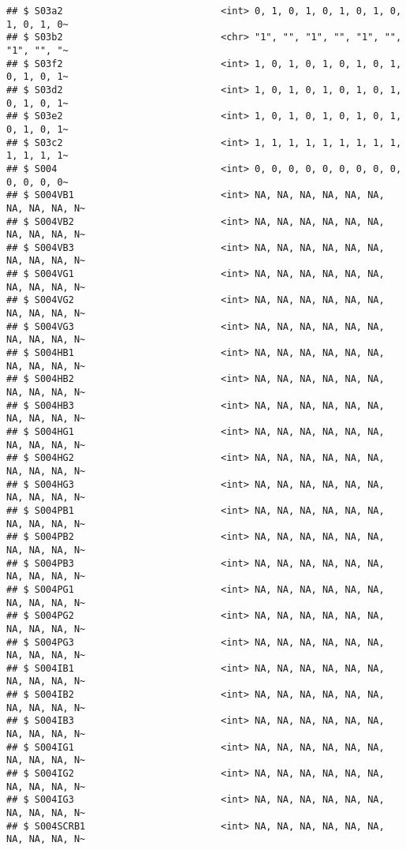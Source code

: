 \documentclass[
]{article}
\begin{document}
\begin{verbatim}
## $ S03a2                            <int> 0, 1, 0, 1, 0, 1, 0, 1, 0, 1, 0, 1, 0~
## $ S03b2                            <chr> "1", "", "1", "", "1", "", "1", "", "~
## $ S03f2                            <int> 1, 0, 1, 0, 1, 0, 1, 0, 1, 0, 1, 0, 1~
## $ S03d2                            <int> 1, 0, 1, 0, 1, 0, 1, 0, 1, 0, 1, 0, 1~
## $ S03e2                            <int> 1, 0, 1, 0, 1, 0, 1, 0, 1, 0, 1, 0, 1~
## $ S03c2                            <int> 1, 1, 1, 1, 1, 1, 1, 1, 1, 1, 1, 1, 1~
## $ S004                             <int> 0, 0, 0, 0, 0, 0, 0, 0, 0, 0, 0, 0, 0~
## $ S004VB1                          <int> NA, NA, NA, NA, NA, NA, NA, NA, NA, N~
## $ S004VB2                          <int> NA, NA, NA, NA, NA, NA, NA, NA, NA, N~
## $ S004VB3                          <int> NA, NA, NA, NA, NA, NA, NA, NA, NA, N~
## $ S004VG1                          <int> NA, NA, NA, NA, NA, NA, NA, NA, NA, N~
## $ S004VG2                          <int> NA, NA, NA, NA, NA, NA, NA, NA, NA, N~
## $ S004VG3                          <int> NA, NA, NA, NA, NA, NA, NA, NA, NA, N~
## $ S004HB1                          <int> NA, NA, NA, NA, NA, NA, NA, NA, NA, N~
## $ S004HB2                          <int> NA, NA, NA, NA, NA, NA, NA, NA, NA, N~
## $ S004HB3                          <int> NA, NA, NA, NA, NA, NA, NA, NA, NA, N~
## $ S004HG1                          <int> NA, NA, NA, NA, NA, NA, NA, NA, NA, N~
## $ S004HG2                          <int> NA, NA, NA, NA, NA, NA, NA, NA, NA, N~
## $ S004HG3                          <int> NA, NA, NA, NA, NA, NA, NA, NA, NA, N~
## $ S004PB1                          <int> NA, NA, NA, NA, NA, NA, NA, NA, NA, N~
## $ S004PB2                          <int> NA, NA, NA, NA, NA, NA, NA, NA, NA, N~
## $ S004PB3                          <int> NA, NA, NA, NA, NA, NA, NA, NA, NA, N~
## $ S004PG1                          <int> NA, NA, NA, NA, NA, NA, NA, NA, NA, N~
## $ S004PG2                          <int> NA, NA, NA, NA, NA, NA, NA, NA, NA, N~
## $ S004PG3                          <int> NA, NA, NA, NA, NA, NA, NA, NA, NA, N~
## $ S004IB1                          <int> NA, NA, NA, NA, NA, NA, NA, NA, NA, N~
## $ S004IB2                          <int> NA, NA, NA, NA, NA, NA, NA, NA, NA, N~
## $ S004IB3                          <int> NA, NA, NA, NA, NA, NA, NA, NA, NA, N~
## $ S004IG1                          <int> NA, NA, NA, NA, NA, NA, NA, NA, NA, N~
## $ S004IG2                          <int> NA, NA, NA, NA, NA, NA, NA, NA, NA, N~
## $ S004IG3                          <int> NA, NA, NA, NA, NA, NA, NA, NA, NA, N~
## $ S004SCRB1                        <int> NA, NA, NA, NA, NA, NA, NA, NA, NA, N~

\end{verbatim}
\end{document}

